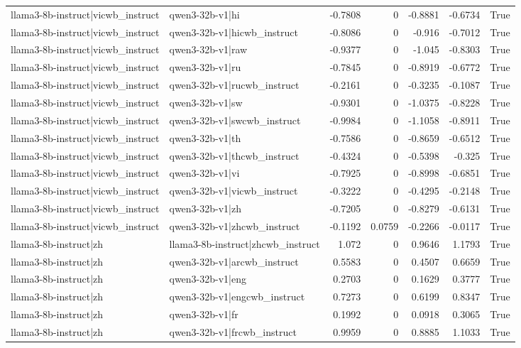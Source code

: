 \begin{table}
\begin{tabular}{l l r r r r l}
llama3-8b-instruct|vicwb_instruct & qwen3-32b-v1|hi & -0.7808 & 0 & -0.8881 & -0.6734 & True \\
llama3-8b-instruct|vicwb_instruct & qwen3-32b-v1|hicwb_instruct & -0.8086 & 0 & -0.916 & -0.7012 & True \\
llama3-8b-instruct|vicwb_instruct & qwen3-32b-v1|raw & -0.9377 & 0 & -1.045 & -0.8303 & True \\
llama3-8b-instruct|vicwb_instruct & qwen3-32b-v1|ru & -0.7845 & 0 & -0.8919 & -0.6772 & True \\
llama3-8b-instruct|vicwb_instruct & qwen3-32b-v1|rucwb_instruct & -0.2161 & 0 & -0.3235 & -0.1087 & True \\
llama3-8b-instruct|vicwb_instruct & qwen3-32b-v1|sw & -0.9301 & 0 & -1.0375 & -0.8228 & True \\
llama3-8b-instruct|vicwb_instruct & qwen3-32b-v1|swcwb_instruct & -0.9984 & 0 & -1.1058 & -0.8911 & True \\
llama3-8b-instruct|vicwb_instruct & qwen3-32b-v1|th & -0.7586 & 0 & -0.8659 & -0.6512 & True \\
llama3-8b-instruct|vicwb_instruct & qwen3-32b-v1|thcwb_instruct & -0.4324 & 0 & -0.5398 & -0.325 & True \\
llama3-8b-instruct|vicwb_instruct & qwen3-32b-v1|vi & -0.7925 & 0 & -0.8998 & -0.6851 & True \\
llama3-8b-instruct|vicwb_instruct & qwen3-32b-v1|vicwb_instruct & -0.3222 & 0 & -0.4295 & -0.2148 & True \\
llama3-8b-instruct|vicwb_instruct & qwen3-32b-v1|zh & -0.7205 & 0 & -0.8279 & -0.6131 & True \\
llama3-8b-instruct|vicwb_instruct & qwen3-32b-v1|zhcwb_instruct & -0.1192 & 0.0759 & -0.2266 & -0.0117 & True \\
llama3-8b-instruct|zh & llama3-8b-instruct|zhcwb_instruct & 1.072 & 0 & 0.9646 & 1.1793 & True \\
llama3-8b-instruct|zh & qwen3-32b-v1|arcwb_instruct & 0.5583 & 0 & 0.4507 & 0.6659 & True \\
llama3-8b-instruct|zh & qwen3-32b-v1|eng & 0.2703 & 0 & 0.1629 & 0.3777 & True \\
llama3-8b-instruct|zh & qwen3-32b-v1|engcwb_instruct & 0.7273 & 0 & 0.6199 & 0.8347 & True \\
llama3-8b-instruct|zh & qwen3-32b-v1|fr & 0.1992 & 0 & 0.0918 & 0.3065 & True \\
llama3-8b-instruct|zh & qwen3-32b-v1|frcwb_instruct & 0.9959 & 0 & 0.8885 & 1.1033 & True \\

\end{tabular}
\end{table}
